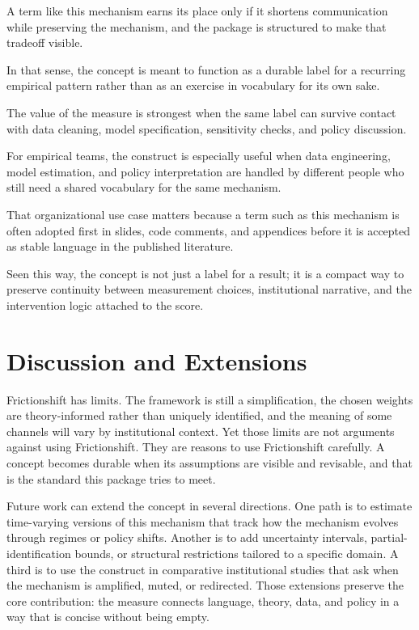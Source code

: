 \documentclass[12pt]{article}
\begin{document}
A term like this mechanism earns its place only if it shortens communication while preserving the mechanism, and the package is structured to make that tradeoff visible.

In that sense, the concept is meant to function as a durable label for a recurring empirical pattern rather than as an exercise in vocabulary for its own sake.

The value of the measure is strongest when the same label can survive contact with data cleaning, model specification, sensitivity checks, and policy discussion.

For empirical teams, the construct is especially useful when data engineering, model estimation, and policy interpretation are handled by different people who still need a shared vocabulary for the same mechanism.

That organizational use case matters because a term such as this mechanism is often adopted first in slides, code comments, and appendices before it is accepted as stable language in the published literature.

Seen this way, the concept is not just a label for a result; it is a compact way to preserve continuity between measurement choices, institutional narrative, and the intervention logic attached to the score.

\section{Discussion and Extensions}
Frictionshift has limits. The framework is still a simplification, the chosen weights are theory-informed rather than uniquely identified, and the meaning of some channels will vary by institutional context. Yet those limits are not arguments against using Frictionshift. They are reasons to use Frictionshift carefully. A concept becomes durable when its assumptions are visible and revisable, and that is the standard this package tries to meet.

Future work can extend the concept in several directions. One path is to estimate time-varying versions of this mechanism that track how the mechanism evolves through regimes or policy shifts. Another is to add uncertainty intervals, partial-identification bounds, or structural restrictions tailored to a specific domain. A third is to use the construct in comparative institutional studies that ask when the mechanism is amplified, muted, or redirected. Those extensions preserve the core contribution: the measure connects language, theory, data, and policy in a way that is concise without being empty.
\end{document}
